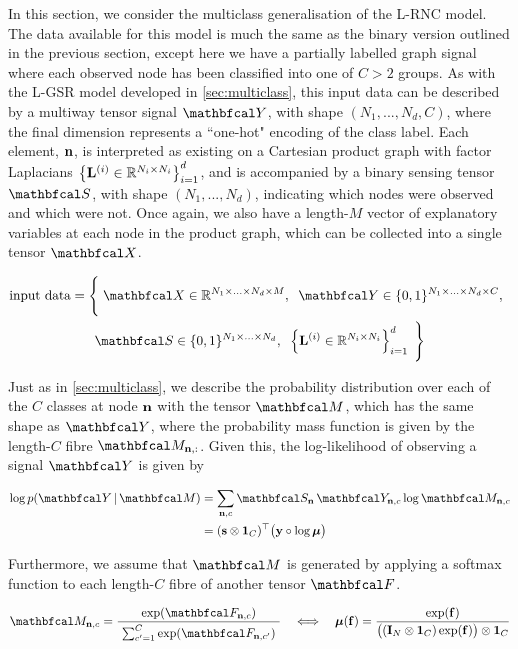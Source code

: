 In this section, we consider the multiclass generalisation of the L-RNC model. The data available for this model is much the same as the binary version outlined in the previous section, except here we have a partially labelled graph signal where each observed node has been classified into one of $C > 2$ groups. As with the L-GSR model developed in \cref{sec:multiclass}, this input data can be described by a multiway tensor signal $\Yt$, with shape $(N_1, ..., N_d, C)$, where the final dimension represents a ``one-hot"  encoding of the class label. Each element, $\mathbf{n}$, is interpreted as existing on a Cartesian product graph with factor Laplacians $\left\{\mathbf{L}^{(i)} \in \mathbb{R}^{N_i \times N_i}\right\}_{i=1}^d$, and is accompanied by a binary sensing tensor $\St$, with shape $(N_1, ..., N_d)$, indicating which nodes were observed and which were not. Once again, we also have a length-$M$ vector of explanatory variables at each node in the product graph, which can be collected into a single tensor $\Xt$. 

\begin{multline*}
    \text{input data} = \Bigg\{\;\Xt \in \R^{N_1 \times ... \times N_d \times M}, \;\; \Yt \in \{0, 1\}^{N_1 \times ... \times N_d \times C}, \;\; \\ 
    \St \in \{0, 1\}^{N_1 \times ... \times N_d} , \;\; \left\{\LL^{(i)} \in \R^{N_i \times N_i}\right\}_{i=1}^d \; \Bigg\}
\end{multline*}

Just as in \cref{sec:multiclass}, we describe the probability distribution over each of the $C$ classes at node $\mathbf{n}$ with the tensor $\Mt$, which has the same shape as $\Yt$, where the probability mass function is given by the length-$C$ fibre $\Mt_{\nn, :}$. Given this, the log-likelihood of observing a signal $\Yt$ is given by 

\begin{align}
   \log p(\Yt \, | \, \Mt) &= \sum_{\nn, c} \St_{\nn} \, \Yt_{\nn, c} \log \Mt_{\nn, c} \notag \\
   &= (\s \otimes \one_C)^\top \big(\y \circ \log \muu \big)
\end{align}

Furthermore, we assume that $\Mt$ is generated by applying a softmax function to each length-$C$ fibre of another tensor $\Ft$. 

\begin{equation}
    \Mt_{\nn, c} = \frac{\exp(\Ft_{\nn, c})}{ \raisebox{-0.1cm} { $\sum_{c'=1}^C \exp(\Ft_{\nn, c'})$ }}  \quad \Longleftrightarrow \quad \muu(\f) = \frac{\exp(\f)}{ \big((\I_N \otimes \one_C) \exp(\f)\big) \otimes \one_C}
\end{equation}


